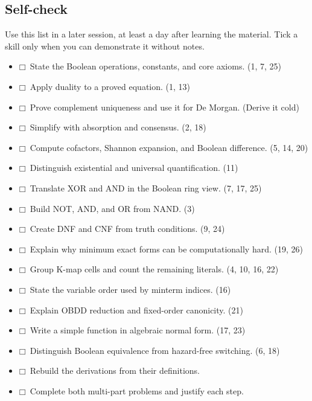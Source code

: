 \documentclass[11pt]{article}
\begin{document}
\begin{keepsection}
\section{Self-check}

Use this list in a later session, at least a day after learning the material. Tick a skill only when you can demonstrate it without notes.

\begin{itemize}
\item $\mdlgwhtsquare$\ State the Boolean operations, constants, and core axioms. (1, 7, 25)
\item $\mdlgwhtsquare$\ Apply duality to a proved equation. (1, 13)
\item $\mdlgwhtsquare$\ Prove complement uniqueness and use it for De Morgan. (Derive it cold)
\item $\mdlgwhtsquare$\ Simplify with absorption and consensus. (2, 18)
\item $\mdlgwhtsquare$\ Compute cofactors, Shannon expansion, and Boolean difference. (5, 14, 20)
\item $\mdlgwhtsquare$\ Distinguish existential and universal quantification. (11)
\item $\mdlgwhtsquare$\ Translate XOR and AND in the Boolean ring view. (7, 17, 25)
\item $\mdlgwhtsquare$\ Build NOT, AND, and OR from NAND. (3)
\item $\mdlgwhtsquare$\ Create DNF and CNF from truth conditions. (9, 24)
\item $\mdlgwhtsquare$\ Explain why minimum exact forms can be computationally hard. (19, 26)
\item $\mdlgwhtsquare$\ Group K-map cells and count the remaining literals. (4, 10, 16, 22)
\item $\mdlgwhtsquare$\ State the variable order used by minterm indices. (16)
\item $\mdlgwhtsquare$\ Explain OBDD reduction and fixed-order canonicity. (21)
\item $\mdlgwhtsquare$\ Write a simple function in algebraic normal form. (17, 23)
\item $\mdlgwhtsquare$\ Distinguish Boolean equivalence from hazard-free switching. (6, 18)
\item $\mdlgwhtsquare$\ Rebuild the derivations from their definitions.
\item $\mdlgwhtsquare$\ Complete both multi-part problems and justify each step.
\end{itemize}
\end{keepsection}
\end{document}
